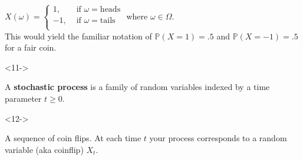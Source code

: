 \documentclass[10pt]{beamer}
\begin{document}
\begin{frame}[t]
\begin{onlyenv}
\begin{example}
      \vskip 5pt
      $X(\omega) = \begin{cases}
        1, &\text{ if }\omega = \text{heads}\\
        -1, &\text{ if }\omega = \text{tails}\\
      \end{cases}$ \hspace*{10mm} where $\omega \in \Omega$. \\
      \vskip 5pt
      This would yield the familiar notation of $\mathbb{P}(X = 1) = .5$ and $\mathbb{P}(X = -1) = .5$ for a fair coin.
    \end{example} 
    \end{onlyenv}
    \begin{onlyenv}<11->
      \begin{definition}
        A \textbf{stochastic process} is a family of random variables indexed by a time parameter $t \geq 0$.
      \end{definition}
    \end{onlyenv}
    \begin{onlyenv}<12->
      \begin{example}
        A sequence of coin flips. At each time $t$ your process corresponds to a random variable (aka coinflip) $X_t$.
      \end{example}
    \end{onlyenv}
\end{frame}
\end{document}
